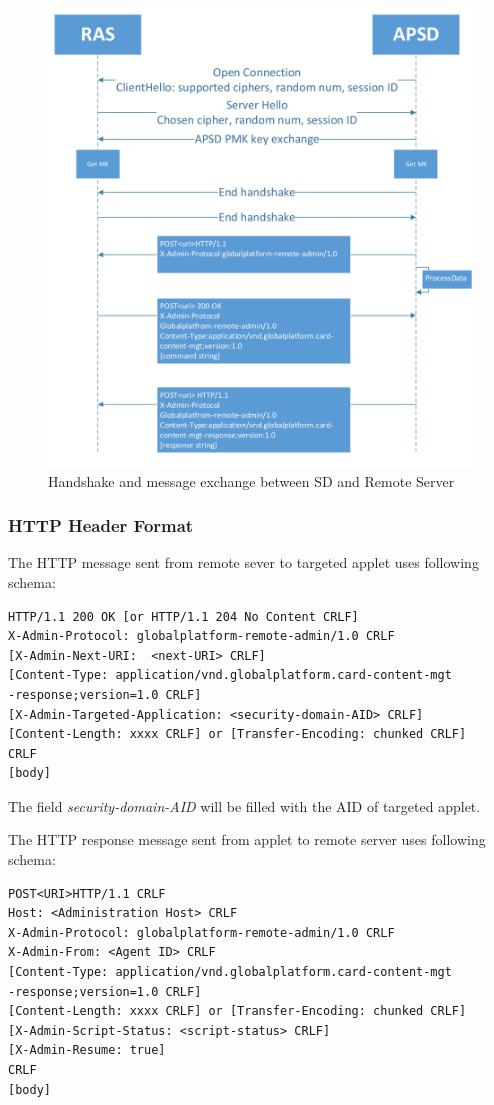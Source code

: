 \begin{figure}[!htbp]

	\centering
	\includegraphics[width=1\textwidth]{communication-flow}
		\caption{Handshake and message exchange between SD and Remote Server}
	\label{fig:communication-flow}
\end{figure}

\subsubsection{HTTP Header Format}
The HTTP message sent from remote sever to targeted applet uses following schema\cite{gp}:
\begin{verbatim}
HTTP/1.1 200 OK [or HTTP/1.1 204 No Content CRLF]
X-Admin-Protocol: globalplatform-remote-admin/1.0 CRLF
[X-Admin-Next-URI:  <next-URI> CRLF]
[Content-Type: application/vnd.globalplatform.card-content-mgt
-response;version=1.0 CRLF]
[X-Admin-Targeted-Application: <security-domain-AID> CRLF]
[Content-Length: xxxx CRLF] or [Transfer-Encoding: chunked CRLF]
CRLF
[body]
\end{verbatim}
The field \emph{security-domain-AID} will be filled with the AID of targeted applet.


The HTTP response message sent from applet to remote server uses following schema\cite{gp}:
\begin{verbatim}
POST<URI>HTTP/1.1 CRLF
Host: <Administration Host> CRLF
X-Admin-Protocol: globalplatform-remote-admin/1.0 CRLF
X-Admin-From: <Agent ID> CRLF
[Content-Type: application/vnd.globalplatform.card-content-mgt
-response;version=1.0 CRLF]
[Content-Length: xxxx CRLF] or [Transfer-Encoding: chunked CRLF]
[X-Admin-Script-Status: <script-status> CRLF]
[X-Admin-Resume: true]
CRLF
[body]
\end{verbatim}

